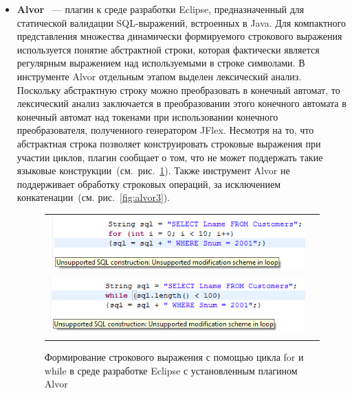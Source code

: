 \begin{itemize}    
\item \textbf{Alvor}~\cite{Alvor, AlvorUrl} {---} плагин к среде разработки Eclipse, предназначенный для статической валидации SQL-выражений, встроенных в Java. Для компактного представления множества динамически формируемого строкового выражения используется понятие абстрактной строки, которая фактически является регулярным выражением над используемыми в строке символами. В инструменте Alvor отдельным этапом выделен лексический анализ. Поскольку абстрактную строку можно преобразовать в конечный автомат, то лексический анализ заключается в преобразовании этого конечного автомата в конечный автомат над токенами при  использовании конечного преобразователя, полученного генератором JFlex. Несмотря на то, что абстрактная строка позволяет конструировать строковые выражения при участии циклов, плагин сообщает о том, что не может поддержать такие языковые конструкции~(см.~рис.~\ref{fig:alvor2}). Также инструмент Alvor не поддерживает обработку строковых операций, за исключением конкатенации~(см. рис.~\ref{fig:alvor3}).


\begin{figure}[h!]
\begin{center}
\begin{tabular}{  c  c }
\begin{minipage}{\textwidth}
  \includegraphics[width=\linewidth]{Polubelova/alvor2.png}
\end{minipage}\\    
\begin{minipage}{\textwidth}
  \includegraphics[width=\linewidth]{Polubelova/alvor1.png}
\end{minipage}
\end{tabular}    
\caption{Формирование строкового выражения с помощью цикла for и while в среде разработке Eclipse с установленным плагином Alvor}
\label{fig:alvor2} 
\end{center}
\end{figure}


\end{itemize}
